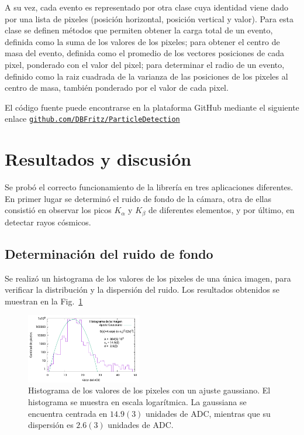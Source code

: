\documentclass[twoside,twocolumn]{article}
\begin{document}
      A su vez, cada evento es representado por otra clase cuya identidad viene dado por una lista de pixeles (posición horizontal,
      posición vertical y valor). Para esta clase se definen métodos que permiten
      obtener la carga total de un evento, definida como la suma de los valores de los pixeles;
      para obtener el centro de masa del evento,
      definida como el promedio de los vectores posiciones de cada pixel,
      ponderado con el valor del pixel;
      para determinar el radio de un evento, definido como la raiz cuadrada de la varianza de las posiciones
      de los pixeles al centro de masa, también ponderado por el valor de cada pixel.

      El código fuente puede encontrarse en la plataforma GitHub mediante el siguiente enlace
      \href{https://github.com/DBFritz/ParticleDetections}{\texttt{github.com/DBFritz/ParticleDetection}}

  \section{Resultados y discusión}\label{sec:results}
    Se probó el correcto funcionamiento de la librería en tres aplicaciones diferentes.
    En primer lugar se determinó el ruido de fondo de la cámara,
    otra de ellas consistió en observar los picos $K_{\alpha}$ y $K_{\beta}$ de diferentes elementos,
    y por último, en detectar rayos cósmicos.

    \subsection{Determinación del ruido de fondo}\label{sec:results:background}
      Se realizó un histograma de los valores de los pixeles de una única imagen,
      para verificar la distribución y la dispersión del ruido.
      Los resultados obtenidos se muestran en la Fig.~\ref{fig:histogram}

      \begin{figure}[h]
        \includegraphics[width=0.45\textwidth]{figures/background_histo.pdf}
        \caption{Histograma de los valores de los pixeles con un ajuste gaussiano.
          El histograma se muestra en escala logarítmica.
          La gaussiana se encuentra centrada en $14.9(3)$ unidades de ADC,
          mientras que su dispersión es $2.6(3)$ unidades de ADC.}
        \label{fig:histogram}
      \end{figure}
      
\end{document}
